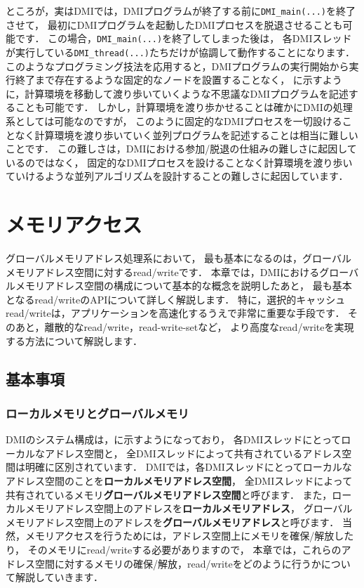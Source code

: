 \documentclass[report,12pt]{jsbook}
\begin{document}
ところが，実はDMIでは，DMIプログラムが終了する前に\texttt{DMI\_main(...)}を終了させて，
最初にDMIプログラムを起動したDMIプロセスを脱退させることも可能です．
この場合，\texttt{DMI\_main(...)}を終了してしまった後は，
各DMIスレッドが実行している\texttt{DMI\_thread(...)}たちだけが協調して動作することになります．
このようなプログラミング技法を応用すると，DMIプログラムの実行開始から実行終了まで存在するような固定的なノードを設置することなく，
に示すように，計算環境を移動して渡り歩いていくような不思議なDMIプログラムを記述することも可能です．
しかし，計算環境を渡り歩かせることは確かにDMIの処理系としては可能なのですが，
このように固定的なDMIプロセスを一切設けることなく計算環境を渡り歩いていく並列プログラムを記述することは相当に難しいことです．
この難しさは，DMIにおける参加/脱退の仕組みの難しさに起因しているのではなく，
固定的なDMIプロセスを設けることなく計算環境を渡り歩いていけるような並列アルゴリズムを設計することの難しさに起因しています．

\chapter{メモリアクセス}

グローバルメモリアドレス処理系において，
最も基本になるのは，グローバルメモリアドレス空間に対するread/writeです．
本章では，DMIにおけるグローバルメモリアドレス空間の構成について基本的な概念を説明したあと，
最も基本となるread/writeのAPIについて詳しく解説します．
特に，選択的キャッシュread/writeは，アプリケーションを高速化するうえで非常に重要な手段です．
そのあと，離散的なread/write，read-write-setなど，
より高度なread/writeを実現する方法について解説します．

\section{基本事項}

\subsection{ローカルメモリとグローバルメモリ}

DMIのシステム構成は，に示すようになっており，
各DMIスレッドにとってローカルなアドレス空間と，
全DMIスレッドによって共有されているアドレス空間は明確に区別されています．
DMIでは，各DMIスレッドにとってローカルなアドレス空間のことを\textbf{ローカルメモリアドレス空間}，
全DMIスレッドによって共有されているメモリ\textbf{グローバルメモリアドレス空間}と呼びます．
また，ローカルメモリアドレス空間上のアドレスを\textbf{ローカルメモリアドレス}，
グローバルメモリアドレス空間上のアドレスを\textbf{グローバルメモリアドレス}と呼びます．
当然，メモリアクセスを行うためには，アドレス空間上にメモリを確保/解放したり，
そのメモリにread/writeする必要がありますので，
本章では，これらのアドレス空間に対するメモリの確保/解放，read/writeをどのように行うかについて解説していきます．
\end{document}
